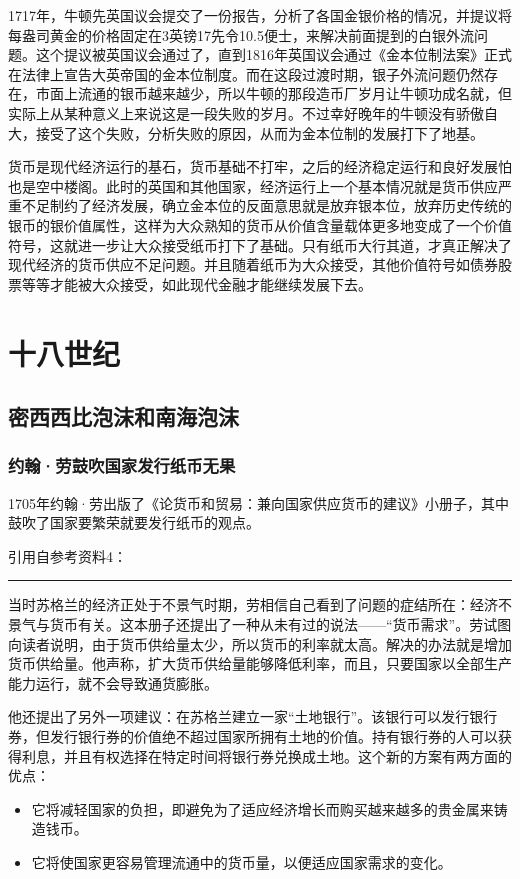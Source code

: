 \documentclass[12pt,oneside]{book}
\newcommand\hr{\par\noindent\hrule}
\begin{document}
1717年，牛顿先英国议会提交了一份报告，分析了各国金银价格的情况，并提议将每盎司黄金的价格固定在3英镑17先令10.5便士，来解决前面提到的白银外流问题。这个提议被英国议会通过了，直到1816年英国议会通过《金本位制法案》正式在法律上宣告大英帝国的金本位制度。而在这段过渡时期，银子外流问题仍然存在，市面上流通的银币越来越少，所以牛顿的那段造币厂岁月让牛顿功成名就，但实际上从某种意义上来说这是一段失败的岁月。不过幸好晚年的牛顿没有骄傲自大，接受了这个失败，分析失败的原因，从而为金本位制的发展打下了地基。

货币是现代经济运行的基石，货币基础不打牢，之后的经济稳定运行和良好发展怕也是空中楼阁。此时的英国和其他国家，经济运行上一个基本情况就是货币供应严重不足制约了经济发展，确立金本位的反面意思就是放弃银本位，放弃历史传统的银币的银价值属性，这样为大众熟知的货币从价值含量载体更多地变成了一个价值符号，这就进一步让大众接受纸币打下了基础。只有纸币大行其道，才真正解决了现代经济的货币供应不足问题。并且随着纸币为大众接受，其他价值符号如债券股票等等才能被大众接受，如此现代金融才能继续发展下去。

\part{十八世纪}


\chapter{密西西比泡沫和南海泡沫}
\section{约翰·劳鼓吹国家发行纸币无果}
1705年约翰·劳出版了《论货币和贸易：兼向国家供应货币的建议》小册子，其中鼓吹了国家要繁荣就要发行纸币的观点。

引用自参考资料4：
\hr
当时苏格兰的经济正处于不景气时期，劳相信自己看到了问题的症结所在：经济不景气与货币有关。这本册子还提出了一种从未有过的说法——“货币需求”。劳试图向读者说明，由于货币供给量太少，所以货币的利率就太高。解决的办法就是增加货币供给量。他声称，扩大货币供给量能够降低利率，而且，只要国家以全部生产能力运行，就不会导致通货膨胀。

他还提出了另外一项建议：在苏格兰建立一家“土地银行”。该银行可以发行银行券，但发行银行券的价值绝不超过国家所拥有土地的价值。持有银行券的人可以获得利息，并且有权选择在特定时间将银行券兑换成土地。这个新的方案有两方面的优点：

\begin{itemize}
\item 它将减轻国家的负担，即避免为了适应经济增长而购买越来越多的贵金属来铸造钱币。
\item 它将使国家更容易管理流通中的货币量，以便适应国家需求的变化。
\end{itemize}
\end{document}
